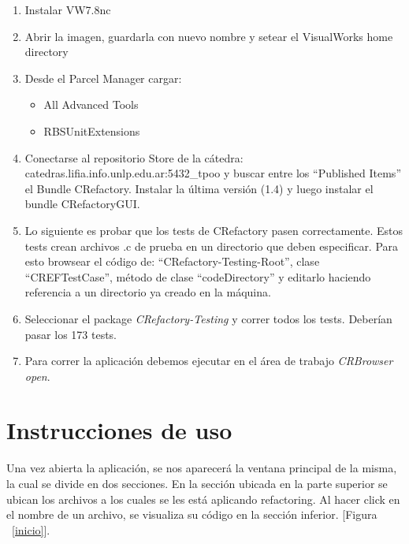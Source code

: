 \documentclass[a4paper,oneside,12pt]{article}
\begin{document}
\begin{enumerate}
\item Instalar VW7.8nc
\item Abrir la imagen, guardarla con nuevo nombre y setear el VisualWorks home directory

\item Desde el Parcel Manager cargar:
  \begin{itemize}
  \item All Advanced Tools
  \item RBSUnitExtensions
  \end{itemize}
  
\item Conectarse al repositorio Store de la c\'atedra: catedras.lifia.info.unlp.edu.ar:5432\_tpoo y buscar entre los “Published Items” el Bundle CRefactory. Instalar la \'ultima versi\'on (1.4) y luego instalar el bundle CRefactoryGUI.

\item Lo siguiente es probar que los tests de CRefactory pasen correctamente. Estos tests crean archivos .c de prueba en un directorio que deben especificar. Para esto browsear el c\'odigo de: “CRefactory-Testing-Root”, clase “CREFTestCase”, m\'etodo de clase “codeDirectory” y editarlo haciendo referencia a un directorio ya creado en la m\'aquina.
  
\item Seleccionar el package {\it CRefactory-Testing} y correr todos los tests. Deber\'ian pasar los 173 tests.

\item Para correr la aplicaci\'on debemos ejecutar en el \'area de trabajo  {\it CRBrowser open}. 
\end{enumerate}

\section{Instrucciones de uso}

Una vez abierta la aplicación, se nos aparecerá la ventana principal de la misma, la cual se divide en dos secciones. En la sección ubicada en la parte superior se ubican los archivos a los cuales se les está aplicando refactoring. Al hacer click en el nombre de un archivo, se visualiza su código en la sección inferior. [Figura ~\ref{inicio}].
\end{document}

